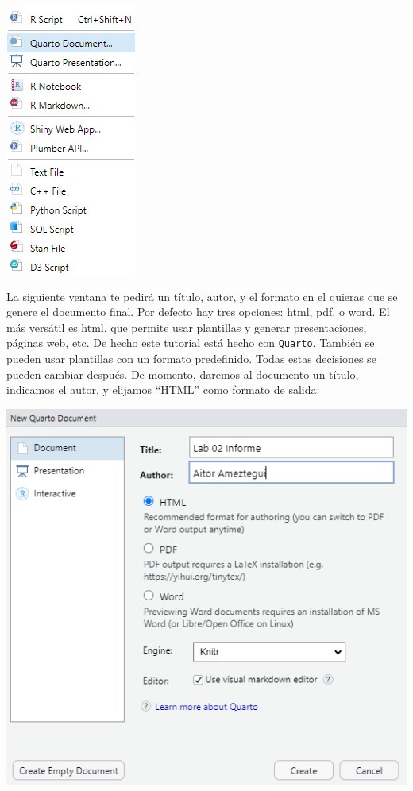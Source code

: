 \documentclass[
  letterpaper,
  DIV=11,
  numbers=noendperiod]{scrreprt}
\begin{document}
\includegraphics{images/02-intro-rmarkdown/open_quarto.png}

La siguiente ventana te pedirá un título, autor, y el formato en el
quieras que se genere el documento final. Por defecto hay tres opciones:
html, pdf, o word. El más versátil es html, que permite usar plantillas
y generar presentaciones, páginas web, etc. De hecho este tutorial está
hecho con \texttt{Quarto}. También se pueden usar plantillas con un
formato predefinido. Todas estas decisiones se pueden cambiar después.
De momento, daremos al documento un título, indicamos el autor, y
elijamos ``HTML'' como formato de salida:

\includegraphics{images/02-intro-rmarkdown/title_quarto.png}
\end{document}
